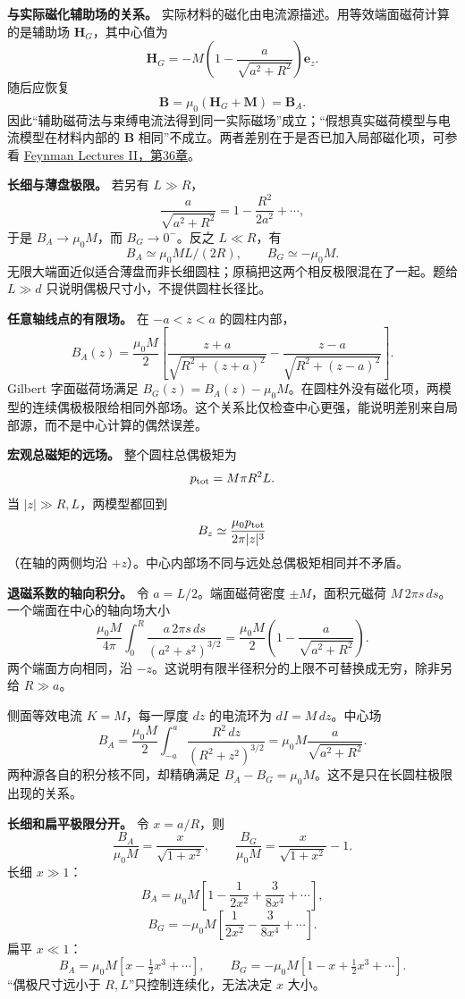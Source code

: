 \documentclass[12pt,a4paper,UTF8]{ctexart}
\begin{document}
\textbf{与实际磁化辅助场的关系。}
实际材料的磁化由电流源描述。用等效端面磁荷计算的是辅助场
\(\boldsymbol H_G\)，其中心值为 \[
\boldsymbol H_G=-M\left(1-\frac a{\sqrt{a^2+R^2}}\right)\boldsymbol e_z.
\] 随后应恢复 \[
\boldsymbol B=\mu_0(\boldsymbol H_G+\boldsymbol M)
=\boldsymbol B_A.
\]
因此``辅助磁荷法与束缚电流法得到同一实际磁场''成立；``假想真实磁荷模型与电流模型在材料内部的
\(\boldsymbol B\) 相同''不成立。两者差别在于是否已加入局部磁化项，可参看
\href{https://www.feynmanlectures.caltech.edu/II_36.html}{Feynman
Lectures II，第36章}。

\textbf{长细与薄盘极限。} 若另有 \(L\gg R\)， \[
\frac a{\sqrt{a^2+R^2}}
=1-\frac{R^2}{2a^2}+\cdots,
\] 于是 \(B_A\to\mu_0M\)，而 \(B_G\to0^-\)。反之 \(L\ll R\)，有 \[
B_A\simeq\mu_0M L/(2R),\qquad
B_G\simeq-\mu_0M.
\]
无限大端面近似适合薄盘而非长细圆柱；原稿把这两个相反极限混在了一起。题给
\(L\gg d\) 只说明偶极尺寸小，不提供圆柱长径比。

\textbf{任意轴线点的有限场。} 在 \(-a<z<a\) 的圆柱内部， \[
B_A(z)=\frac{\mu_0M}{2}
\left[
\frac{z+a}{\sqrt{R^2+(z+a)^2}}
-\frac{z-a}{\sqrt{R^2+(z-a)^2}}
\right].
\] Gilbert 字面磁荷场满足
\(B_G(z)=B_A(z)-\mu_0M\)。在圆柱外没有磁化项，两模型的连续偶极极限给相同外部场。这个关系比仅检查中心更强，能说明差别来自局部源，而不是中心计算的偶然误差。

\textbf{宏观总磁矩的远场。} 整个圆柱总偶极矩为 \[
p_{\rm tot}=M\pi R^2L.
\] 当 \(|z|\gg R,L\)，两模型都回到 \[
B_z\simeq\frac{\mu_0p_{\rm tot}}{2\pi|z|^3}
\] （在轴的两侧均沿 \(+z\)）。中心内部场不同与远处总偶极矩相同并不矛盾。

\textbf{退磁系数的轴向积分。} 令 \(a=L/2\)。端面磁荷密度
\(\pm M\)，面积元磁荷 \(M\,2\pi s\,ds\)。一个端面在中心的轴向场大小 \[
\frac{\mu_0M}{4\pi}\int_0^R
\frac{a\,2\pi s\,ds}{(a^2+s^2)^{3/2}}
=\frac{\mu_0M}{2}\left(1-\frac a{\sqrt{a^2+R^2}}\right).
\] 两个端面方向相同，沿
\(-z\)。这说明有限半径积分的上限不可替换成无穷，除非另给 \(R\gg a\)。

侧面等效电流 \(K=M\)，每一厚度 \(dz\) 的电流环为 \(dI=M\,dz\)。中心场 \[
B_A=\frac{\mu_0M}{2}\int_{-a}^{a}
\frac{R^2\,dz}{(R^2+z^2)^{3/2}}
=\mu_0M\frac a{\sqrt{a^2+R^2}}.
\] 两种源各自的积分核不同，却精确满足
\(B_A-B_G=\mu_0M\)。这不是只在长圆柱极限出现的关系。

\textbf{长细和扁平极限分开。} 令 \(x=a/R\)，则 \[
\frac{B_A}{\mu_0M}=\frac{x}{\sqrt{1+x^2}},
\qquad \frac{B_G}{\mu_0M}=\frac{x}{\sqrt{1+x^2}}-1.
\] 长细 \(x\gg1\)： \[
B_A=\mu_0M\left[1-\frac1{2x^2}+\frac3{8x^4}+\cdots\right],
\] \[
B_G=-\mu_0M\left[\frac1{2x^2}-\frac3{8x^4}+\cdots\right].
\] 扁平 \(x\ll1\)： \[
B_A=\mu_0M[x-\tfrac12x^3+\cdots],\qquad
B_G=-\mu_0M[1-x+\tfrac12x^3+\cdots].
\] ``偶极尺寸远小于 \(R,L\)''只控制连续化，无法决定 \(x\) 大小。
\end{document}
